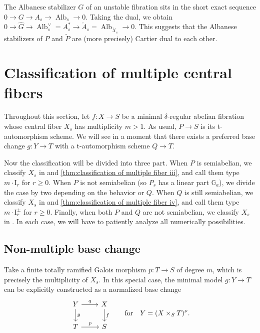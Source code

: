\documentclass[reqno, letterpaper]{amsart}
\numberwithin{equation}{subsection}
\let\to\longrightarrow
\newcommand{\GG}{\mathbb{G}}
\DeclareMathOperator{\Alb}{Alb}
\begin{document}
			\begin{remark}
				The Albanese stabilizer $G$ of an unstable fibration sits in the short exact sequence $0 \to G \to A_s \to \Alb_s \to 0$. Taking the dual, we obtain $0 \to \hat G \to \Alb_s^\vee = A_s^* \to \check A_s = \Alb_{\check X_s} \to 0$. This suggests that the Albanese stabilizers of $P$ and $\check P$ are (more precisely) Cartier dual to each other.
			\end{remark}
			
			
			
\section{Classification of multiple central fibers} \label{sec:classification of multiple fibers}
	Throughout this section, let $f : X \to S$ be a minimal $\delta$-regular abelian fibration whose central fiber $X_s$ has multiplicity $m > 1$. As usual, $P \to S$ is its t-automorphism scheme. We will see in a moment that there exists a preferred base change $g : Y \to T$ with a t-automorphism scheme $Q \to T$.
	
	Now the classification will be divided into three part. When $P$ is semiabelian, we classify $X_s$ in  and \ref{thm:classification of multiple fiber iii}, and call them type $m \cdot \mathrm I_r$ for $r \ge 0$. When $P$ is not semiabelian (so $P_s$ has a linear part $\GG_a$), we divide the case by two depending on the behavior or $Q$. When $Q$ is still semiabelian, we classify $X_s$ in  and \ref{thm:classification of multiple fiber iv}, and call them type $m \cdot \mathrm I_r^{\pm}$ for $r \ge 0$. Finally, when both $P$ and $Q$ are not semiabelian, we classify $X_s$ in . In each case, we will have to patiently analyze all numerically possibilities.
	
	
	
	\subsection{Non-multiple base change}
		Take a finite totally ramified Galois morphism $p : T \to S$ of degree $m$, which is precisely the multiplicity of $X_s$. In this special case, the minimal model $g : Y \to T$ can be explicitly constructed as a normalized base change
		\begin{equation} \label{diag:degree m base change}
		\begin{tikzcd}
			Y \arrow[r, "q"] \arrow[d, "g"] & X \arrow[d, "f"] \\
			T \arrow[r, "p"] & S
		\end{tikzcd} \qquad\mbox{for}\quad Y = (X \times_S T)^\nu .
		\end{equation}
		
\end{document}
